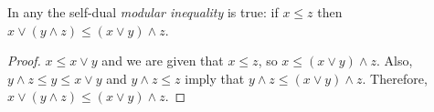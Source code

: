 \documentclass[12pt]{article}
\begin{document}
In any  the self-dual \emph{modular inequality} is true:
if $ x\leq z $ then $ x\lor (y\land z)\leq (x\lor y)\land z $.
\begin{proof}
$ x\leq x\lor y $ and we are given that $ x\leq z$, so $ x\leq (x\lor y)\land z $.
Also, $ y\land z\leq y \leq x\lor y $ and $ y\land z\leq z $ imply that $ y\land z\leq (x\lor y)\land z$.
Therefore, $ x\lor (y\land z)\leq(x\lor y)\land z$.
\end{proof}
\end{document}
